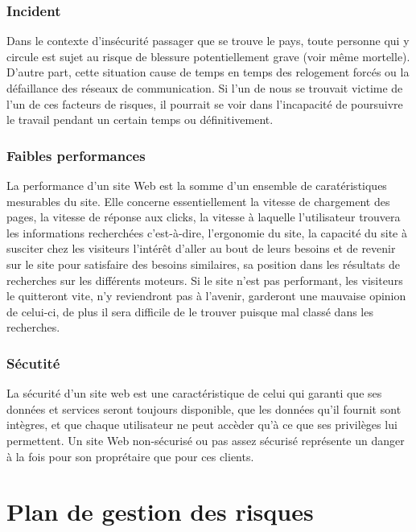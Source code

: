		\subsubsection{Incident}
			Dans le contexte d'ins\'ecurit\'e passager que se trouve le pays, toute personne qui y circule est sujet au risque de blessure potentiellement grave (voir m\^eme mortelle). D'autre part, cette situation cause de temps en temps des relogement forc\'es ou la d\'efaillance des r\'eseaux de communication. Si l'un de nous se trouvait victime de l'un de ces facteurs de risques, il pourrait se voir dans l'incapacit\'e de poursuivre le travail pendant un certain temps ou d\'efinitivement.


		\subsubsection{Faibles performances}
			La performance d'un site Web est la somme d'un ensemble de carat\'eristiques mesurables du site. Elle concerne essentiellement la vitesse de chargement des pages, la vitesse de r\'eponse aux clicks, la vitesse \`a laquelle l'utilisateur trouvera les informations recherch\'ees c'est-\`a-dire, l'ergonomie du site, la capacit\'e du site \`a susciter chez les visiteurs l'int\'er\^et d'aller au bout de leurs besoins et de revenir sur le site pour satisfaire des besoins similaires, sa position dans les r\'esultats de recherches sur les diff\'erents moteurs. Si le site n'est pas performant, les visiteurs le quitteront vite, n'y reviendront pas \`a l'avenir, garderont une mauvaise opinion de celui-ci, de plus il sera difficile de le trouver puisque mal class\'e dans les recherches.


		\subsubsection{S\'ecutit\'e}
			La s\'ecurit\'e d'un site web est une caract\'eristique de celui qui garanti que ses donn\'ees et services seront toujours disponible, que les donn\'ees qu'il fournit sont int\`egres, et que chaque utilisateur ne peut acc\`eder qu'\`a ce que ses privil\`eges lui permettent. Un site Web non-s\'ecuris\'e ou pas assez s\'ecuris\'e repr\'esente un danger \`a la fois pour son propr\'etaire que pour ces clients.


	\section{Plan de gestion des risques}
